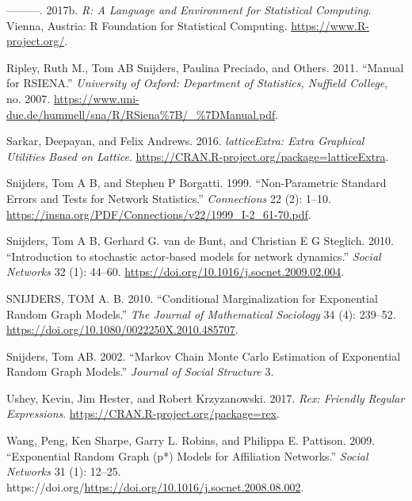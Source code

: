 \documentclass[
]{book}
\newlength{\cslhangindent}
\newlength{\cslentryspacingunit} %
\newenvironment{CSLReferences}[2] %
 {%
  \setlength{\parindent}{0pt}
  \ifodd #1
  \let\oldpar\par
  \def\par{\hangindent=\cslhangindent\oldpar}
  \fi
  \setlength{\parskip}{#2\cslentryspacingunit}
 }%
 {}
\begin{document}
\begin{CSLReferences}{1}{0}
\leavevmode{}%
---------. 2017b. \emph{R: A Language and Environment for Statistical Computing}. Vienna, Austria: R Foundation for Statistical Computing. \url{https://www.R-project.org/}.

\leavevmode{}%
Ripley, Ruth M., Tom AB Snijders, Paulina Preciado, and Others. 2011. {``{Manual for RSIENA}.''} \emph{University of Oxford: Department of Statistics, Nuffield College}, no. 2007. \url{https://www.uni-due.de/hummell/sna/R/RSiena\%7B/_\%7DManual.pdf}.

\leavevmode{}%
Sarkar, Deepayan, and Felix Andrews. 2016. \emph{latticeExtra: Extra Graphical Utilities Based on Lattice}. \url{https://CRAN.R-project.org/package=latticeExtra}.

\leavevmode{}%
Snijders, Tom A B, and Stephen P Borgatti. 1999. {``{Non-Parametric Standard Errors and Tests for Network Statistics}.''} \emph{Connections} 22 (2): 1--10. \url{https://insna.org/PDF/Connections/v22/1999_I-2_61-70.pdf}.

\leavevmode{}%
Snijders, Tom A B, Gerhard G. van de Bunt, and Christian E G Steglich. 2010. {``{Introduction to stochastic actor-based models for network dynamics}.''} \emph{Social Networks} 32 (1): 44--60. \url{https://doi.org/10.1016/j.socnet.2009.02.004}.

\leavevmode{}%
SNIJDERS, TOM A. B. 2010. {``{Conditional Marginalization for Exponential Random Graph Models}.''} \emph{The Journal of Mathematical Sociology} 34 (4): 239--52. \url{https://doi.org/10.1080/0022250X.2010.485707}.

\leavevmode{}%
Snijders, Tom AB. 2002. {``Markov Chain Monte Carlo Estimation of Exponential Random Graph Models.''} \emph{Journal of Social Structure} 3.

\leavevmode{}%
Ushey, Kevin, Jim Hester, and Robert Krzyzanowski. 2017. \emph{Rex: Friendly Regular Expressions}. \url{https://CRAN.R-project.org/package=rex}.

\leavevmode{}%
Wang, Peng, Ken Sharpe, Garry L. Robins, and Philippa E. Pattison. 2009. {``Exponential Random Graph (p*) Models for Affiliation Networks.''} \emph{Social Networks} 31 (1): 12--25. https://doi.org/\url{https://doi.org/10.1016/j.socnet.2008.08.002}.


\end{CSLReferences}
\end{document}
